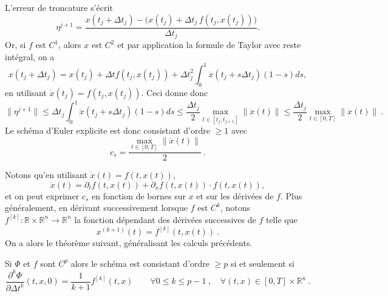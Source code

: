 \hypertarget{ed2-ex_consistance_Euler}{}
\begin{exemple}\label{ed2-ex_consistance_Euler}
L'erreur de troncature s'écrit \[
\eta^{j+1} = \frac{x(t_j + {\Delta t}_j) - \Big( x(t_j) + {\Delta t}_j \, f(t_j,x(t_j)) \Big)}{{\Delta t}_j}.
\] Or, si \(f\) est \(C^1\), alors \(x\) est \(C^2\) et par application
la formule de Taylor avec reste intégral, on a \[
x(t_j + {\Delta t}_j) =  x(t_j) + {\Delta t}f(t_j,x(t_j))  + {\Delta t}_j^2 \int_{0}^{1} \ddot{x}(t_j+s{\Delta t}_j)  (1-s) ds ,
\] en utilisant \(\dot{x}(t_j)=f(t_j,x(t_j))\). Ceci donne donc \[
\|\eta^{j+1}\| \leq {\Delta t}_j  \int_{0}^{1} \ddot{x}(t_j+s{\Delta t}_j)  (1-s) ds \leq \frac{{\Delta t}_j}{2} \max_{t\in [t_j,t_{j+1}]} \|\ddot{x}(t)\| \leq \frac{{\Delta t}_j}{2} \max_{t\in [0,T]} \|\ddot{x}(t)\| \ .
\] Le schéma d'Euler explicite est donc consistant d'ordre \(\geq 1\)
avec \[
c_s= \frac{\max_{t\in [0,T]} \|\ddot{x}(t)\|}{2} \ .
\]

Notons qu'en utilisant \(\dot{x}(t) = f(t,x(t))\), \[
\ddot{x}(t) = \partial_t f(t,x(t)) + \partial_x f(t,x(t)) \cdot f(t,x(t)),
\] et on peut exprimer \(c_s\) en fonction de bornes sur \(x\) et sur
les dérivées de \(f\). Plus généralement, en dérivant successivement
lorsque \(f\) est \(C^k\), notons
\(f^{[k]} : \mathbb{R}\times \mathbb{R}^n \to \mathbb{R}^n\) la fonction
dépendant des dérivées successives de \(f\) telle que \[
x^{(k+1)}(t) = f^{[k]}(t,x(t)) \ .
\] On a alors le théorème suivant, généralisant les calculs précédents.
\end{exemple}

\hypertarget{ed2-theo_CS_consistance_ordre_p}{}
\begin{theoreme}\label{ed2-theo_CS_consistance_ordre_p}
Si \(\Phi\) et \(f\) sont \(C^p\) alors le schéma est consistant d'ordre
\(\geq p\) si et seulement si \[
\frac{\partial^k \Phi}{\partial {\Delta t}^k}(t,x,0) = \frac{1}{k+1}  f^{[k]}(t,x) \qquad \forall 0\leq k\leq p-1 \ , \quad \forall (t,x)\in \left[ 0,T \right]\times \mathbb{R}^n \ .
\]
\end{theoreme}

